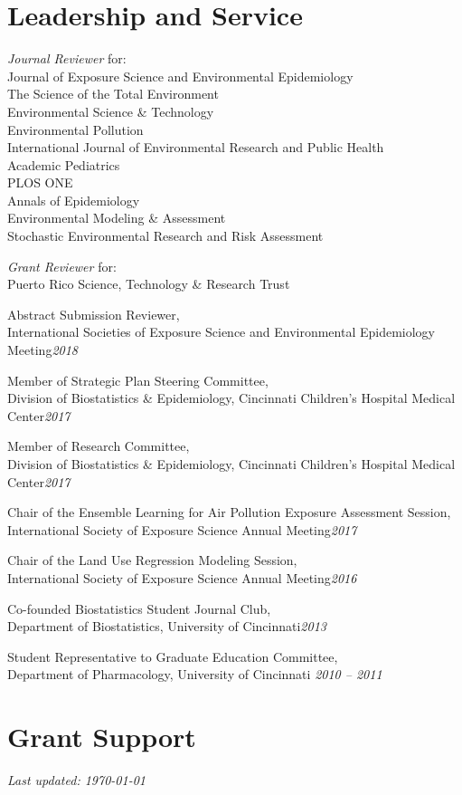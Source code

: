 \documentclass[margin,line]{res}
\newenvironment{list3}{
  \begin{list}{}{%
      \setlength{\itemsep}{0in}
      \setlength{\parsep}{0in} \setlength{\parskip}{0in}
      \setlength{\topsep}{0in} \setlength{\partopsep}{0in}
      \setlength{\leftmargin}{0in}}}{\end{list}}
\begin{document}
\begin{resume}
\section{\sc Leadership and Service}
\begin{list3} \itemsep 4pt
\item[] \textit{Journal Reviewer} for: \\
        Journal of Exposure Science and Environmental Epidemiology \\
        The Science of the Total Environment \\
        Environmental Science \& Technology \\
        Environmental Pollution \\
        International Journal of Environmental Research and Public Health \\
        Academic Pediatrics \\
        PLOS ONE \\
        Annals of Epidemiology \\
        Environmental Modeling \& Assessment \\
        Stochastic Environmental Research and Risk Assessment
\item[] \textit{Grant Reviewer} for: \\
        Puerto Rico Science, Technology \& Research Trust
    \item[] Abstract Submission Reviewer, \\ International Societies of Exposure Science and Environmental Epidemiology Meeting\hfill \textit{2018}
\item[] Member of Strategic Plan Steering Committee, \\Division of Biostatistics \& Epidemiology, Cincinnati Children's Hospital Medical Center\hfill \textit{2017}
\item[] Member of Research Committee, \\Division of Biostatistics \& Epidemiology, Cincinnati Children's Hospital Medical Center\hfill \textit{2017}
\item[] Chair of the Ensemble Learning for Air Pollution Exposure Assessment Session, \\International Society of Exposure Science Annual Meeting\hfill \textit{2017}
\item[] Chair of the Land Use Regression Modeling Session, \\International Society of Exposure Science Annual Meeting\hfill \textit{2016}
\item[] Co-founded Biostatistics Student Journal Club, \\Department of Biostatistics, University of Cincinnati\hfill \textit{2013}
\item[] Student Representative to Graduate Education Committee, \\Department of Pharmacology, University of Cincinnati \hfill \textit{2010 -- 2011}
\end{list3}

\section{\sc Grant Support}


\end{resume}

\vfill

\hfill \textit{Last updated: \today}
\end{document}
